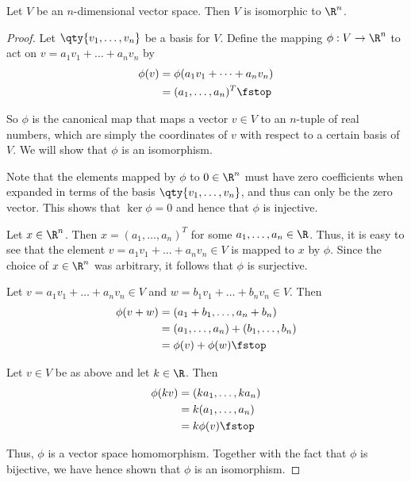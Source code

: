 \begin{theorem}
  \label{thm:iso}
  Let \( V \) be an \( n \)-dimensional vector space. Then \( V \) is isomorphic to \( \R^n \).
\end{theorem}
\begin{proof}
  Let \( \qty{v_1,\dots,v_n} \) be a basis for \( V \). Define the mapping \( \phi:V\to\R^n \) to act on \( v=a_1v_1+\dots+a_nv_n \) by
  \begin{align*}
    \phi(v)&=\phi(a_1v_1+\dots+a_nv_n)\\
    &= (a_1,\dots,a_n)^T\fstop
  \end{align*}

  So \( \phi \) is the canonical map that maps a vector \( v\in V \) to an \( n \)-tuple of real numbers, which are simply the coordinates of \( v \) with respect to a certain basis of \( V \). We will show that \( \phi \) is an isomorphism.

  \vspace{3mm}

  Note that the elements mapped by \( \phi \) to \( 0\in\R^n \) must have zero coefficients when expanded in terms of the basis \( \qty{v_1,\dots, v_n} \), and thus can only be the zero vector. This shows that \( \ker\phi=\qty{0} \) and hence that \( \phi \) is injective.

  \vspace{3mm}

  Let \( x\in\R^n \). Then \( x=(a_1,\dots,a_n)^T \) for some \( a_1,\dots,a_n\in\R \). Thus, it is easy to see that the element \( v=a_1v_1+\dots+a_nv_n\in V \) is mapped to \( x \) by \( \phi \). Since the choice of \( x\in\R^n \) was arbitrary, it follows that \( \phi \) is surjective.

  \vspace{3mm}

  Let \( v=a_1v_1+\dots+a_nv_n\in V \) and \( w=b_1v_1+\dots+b_nv_n\in V \). Then
  \begin{align*}
    \phi(v+w)&= (a_1+b_1,\dots,a_n+b_n)\\
    &= (a_1,\dots,a_n)+(b_1,\dots,b_n)\\
    &= \phi(v)+\phi(w)\fstop
  \end{align*}

  Let \( v\in V \) be as above and let \( k\in\R \). Then
  \begin{align*}
    \phi(kv)&= (ka_1,\dots,ka_n)\\
    &= k(a_1,\dots,a_n)\\
    &= k\phi(v)\fstop
  \end{align*}

  Thus, \( \phi \) is a vector space homomorphism. Together with the fact that \( \phi \) is bijective, we have hence shown that \( \phi \) is an isomorphism.
\end{proof}

